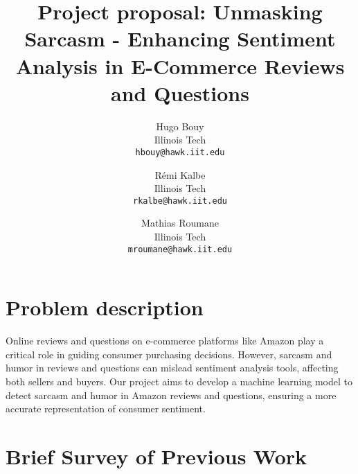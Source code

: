 \documentclass[10pt,twocolumn,letterpaper]{article}
\begin{document}
\title{Project proposal: Unmasking Sarcasm - Enhancing Sentiment Analysis in E-Commerce Reviews and Questions
}

\author{Hugo Bouy\\
Illinois Tech\\
{\tt\small hbouy@hawk.iit.edu}
\and
Rémi Kalbe\\
Illinois Tech\\
{\tt\small rkalbe@hawk.iit.edu}
\and
Mathias Roumane\\
Illinois Tech\\
{\tt\small mroumane@hawk.iit.edu}
}
\maketitle


\section{Problem description}
\label{sec:intro}
Online reviews and questions on e-commerce platforms like Amazon play a critical role in guiding consumer purchasing decisions. However, sarcasm and humor in reviews and questions can mislead sentiment analysis tools, affecting both sellers and buyers. Our project aims to develop a machine learning model to detect sarcasm and humor in Amazon reviews and questions, ensuring a more accurate representation of consumer sentiment.


\section{Brief Survey of Previous Work}
\end{document}

